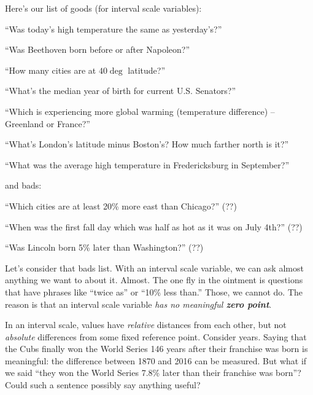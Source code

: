 Here's our list of goods (for interval scale variables):

\begin{compactitem}
\item[\leftthumbsup] ``Was today's high temperature the same as yesterday's?''
\item[\leftthumbsup] ``Was Beethoven born before or after Napoleon?''
\item[\leftthumbsup] ``How many cities are at $40\deg$ latitude?''
\item[\leftthumbsup] ``What's the median year of birth for current U.S. Senators?''
\item[\leftthumbsup] ``Which is experiencing more global warming
(temperature difference) -- Greenland or France?''
\item[\leftthumbsup] ``What's London's latitude minus Boston's? How much
farther north is it?''
\item[\leftthumbsup] ``What was the average high temperature in Fredericksburg
in September?''
\end{compactitem}

and bads:

\begin{compactitem}
\item[\leftthumbsdown] ``Which cities are at least 20\% more east than
Chicago?'' (??)
\item[\leftthumbsdown] ``When was the first fall day which was half as hot as
it was on July 4th?'' (??)
\item[\leftthumbsdown] ``Was Lincoln born 5\% later than Washington?'' (??)
\end{compactitem}

Let's consider that bads list. With an interval scale variable, we can ask
almost anything we want to about it. Almost. The one fly in the ointment is
questions that have phrases like ``twice as'' or ``10\% less than.'' Those, we
cannot do. The reason is that an interval scale variable \textit{has no
meaningful \textbf{zero point}}.

In an interval scale, values have \textit{relative} distances from each other,
but not \textit{absolute} differences from some fixed reference point. Consider
years. Saying that the Cubs finally won the World Series 146 years after their
franchise was born is meaningful: the difference between 1870 and 2016 can be
measured. But what if we said ``they won the World Series 7.8\% later than
their franchise was born''? Could such a sentence possibly say anything useful?

